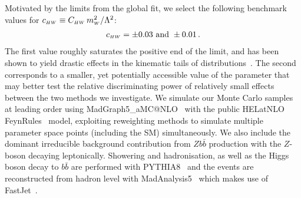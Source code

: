 Motivated by the limits from the global fit, we select the following benchmark values for $c_{\scriptscriptstyle HW}\equiv C_{\scriptscriptstyle HW}~\! m_{\scriptscriptstyle W}^2/\Lambda^2$:
\begin{align}
    c_{\scriptscriptstyle HW} = \pm 0.03 \text{ and } \pm0.01\,.
\end{align}
The first value roughly saturates the positive end of the limit, and has been shown to yield drastic effects in the kinematic tails of distributions~\cite{Degrande:2016dqg}. The second corresponds to a smaller, yet potentially accessible value of the parameter that may better test the relative discriminating power of relatively small effects between the two methods we investigate. We simulate our Monte Carlo samples at leading order using {\sc MadGraph5\_aMC@NLO}~\cite{Alwall:2014hca} with the public {\sc HELatNLO}~\cite{Degrande:2016dqg,Alloul:2013naa} {\sc FeynRules}~\cite{Alloul:2013bka} model, exploiting reweighting methods to simulate multiple parameter space points (including the SM) simultaneously. We also include the dominant irreducible background contribution from $Z b\bar{b}$ production with the $Z$-boson decaying leptonically. Showering and hadronisation, as well as the Higgs boson decay to $b\bar{b}$ are performed with {\sc PYTHIA8}~\cite{pythia8} and the events are reconstructed from hadron level with {\sc MadAnalysis5}~\cite{Conte:2012fm} which makes use of {\sc FastJet}~\cite{Cacciari:2011ma}.

